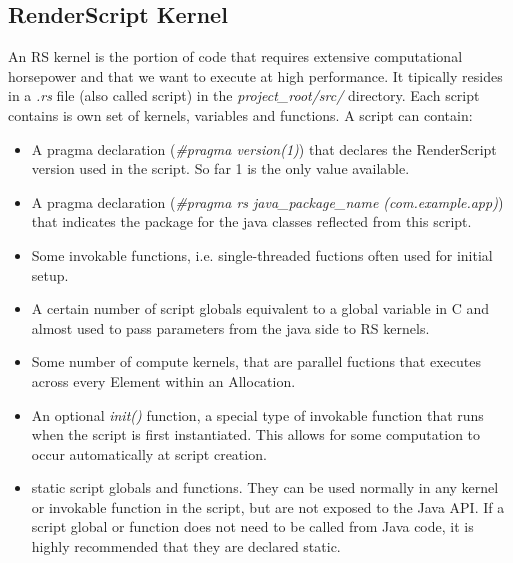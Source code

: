 \documentclass[a4paper,10pt]{article}
\begin{document}
\begin{multicols}{2}
\subsection{RenderScript Kernel}
\label{sub:RSK}
An RS kernel is the portion of code that requires extensive computational horsepower and that we want to execute at high performance. It tipically resides in a \emph{.rs} file (also called script) in the \emph{project\_root/src/} directory. Each script contains is own set of kernels, variables and functions. A script can contain:
\begin{itemize}
\item A pragma declaration (\emph{\#pragma version(1)}) that declares the RenderScript version used in the script. So far 1 is the only value available.
\item A pragma declaration (\emph{\#pragma rs java\_package\_name (com.example.app)}) that indicates the package for the java classes reflected from this script.
\item Some invokable functions, i.e. single-threaded fuctions often used for initial setup.
\item A certain number of script globals equivalent to a global variable in C and almost used to pass parameters from the java side to RS kernels.
\item Some number of compute kernels, that are parallel fuctions that executes across every Element within an Allocation.
\item An optional \emph{init()} function, a special type of invokable function that runs when the script is first instantiated. This allows for some computation to occur automatically at script creation.
\item static script globals and functions. They can be used normally in any kernel or invokable function in the script, but are not exposed to the Java API. If a script global or function does not need to be called from Java code, it is highly recommended that they are declared static.
\end{itemize}


\end{multicols}
\end{document}
